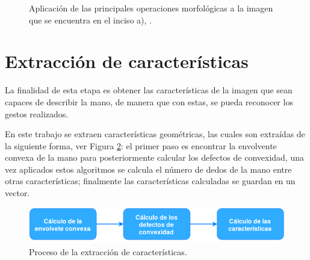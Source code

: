 \begin{figure}[h!]
\caption{Aplicación de las principales operaciones morfológicas a la imagen que se encuentra en el inciso a), \protect\citep{Smith1999}.} \label{fig:OM}
\end{figure} 




\section{Extracción de características}\label{sec:Convexhull} 

La finalidad de esta etapa es obtener las características de la imagen que sean capaces de describir la mano, de manera que con estas, se pueda reconocer los gestos realizados.
   
En este trabajo se extraen características geométricas, las cuales son extraídas de la siguiente forma, ver Figura \ref{fig:DiagramaExtraccionCaracteristicas}: el primer paso es encontrar la envolvente convexa de la mano para posteriormente calcular los defectos de convexidad, una vez aplicados estos algoritmos se calcula el número de dedos de la mano entre otras características; finalmente las características calculadas  se guardan en un vector.  

\begin{figure}[h!]
\begin{center}
\includegraphics[scale=.7]{./Figures/DExtraccion.png}
\end{center}
\caption{Proceso de la extracción de características.}
\label{fig:DiagramaExtraccionCaracteristicas}
\end{figure} 

